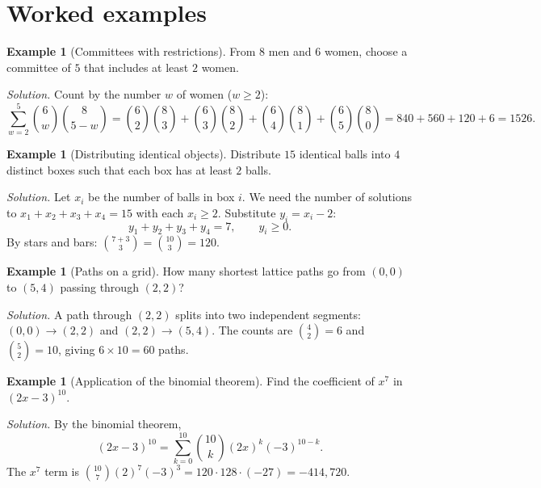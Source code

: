 \documentclass[12pt,a4paper,openany]{book}
\theoremstyle{definition}
\newtheorem{example}[definition]{Example}
\theoremstyle{plain}
\theoremstyle{remark}
\begin{document}
\section{Worked examples}
\label{sec:ch4-worked-examples}

\begin{example}[Committees with restrictions]\label{ex:committee-restricted}
From $8$ men and $6$ women, choose a committee of $5$ that includes at
least $2$ women.

\emph{Solution.}\; Count by the number $w$ of women ($w \geq 2$):
\[
  \sum_{w=2}^{5}\binom{6}{w}\binom{8}{5-w}
  = \binom{6}{2}\binom{8}{3} + \binom{6}{3}\binom{8}{2}
    + \binom{6}{4}\binom{8}{1} + \binom{6}{5}\binom{8}{0}
  = 840 + 560 + 120 + 6 = 1526.
\]
\end{example}

\begin{example}[Distributing identical objects]\label{ex:distribute-identical}
Distribute $15$ identical balls into $4$ distinct boxes such that each box
has at least $2$ balls.

\emph{Solution.}\; Let $x_i$ be the number of balls in box $i$. We need the
number of solutions to $x_1 + x_2 + x_3 + x_4 = 15$ with each $x_i \geq 2$.
Substitute $y_i = x_i - 2$:
\[
  y_1 + y_2 + y_3 + y_4 = 7, \qquad y_i \geq 0.
\]
By stars and bars: $\binom{7 + 3}{3} = \binom{10}{3} = 120$.
\end{example}

\begin{example}[Paths on a grid]\label{ex:grid-paths}
How many shortest lattice paths go from $(0,0)$ to $(5,4)$ passing through
$(2,2)$?

\emph{Solution.}\; A path through $(2,2)$ splits into two independent segments:
$(0,0) \to (2,2)$ and $(2,2) \to (5,4)$. The counts are
$\binom{4}{2} = 6$ and $\binom{5}{2} = 10$, giving $6 \times 10 = 60$ paths.
\end{example}

\begin{example}[Application of the binomial theorem]\label{ex:binomial-application}
Find the coefficient of $x^7$ in $(2x - 3)^{10}$.

\emph{Solution.}\; By the binomial theorem,
\[
  (2x - 3)^{10} = \sum_{k=0}^{10}\binom{10}{k}(2x)^k(-3)^{10-k}.
\]
The $x^7$ term is $\binom{10}{7}(2)^7(-3)^3 = 120 \cdot 128 \cdot (-27) = -414{,}720$.
\end{example}
\end{document}
